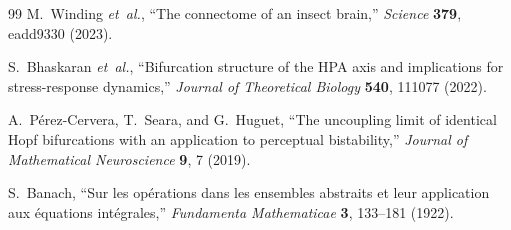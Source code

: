 \documentclass[12pt,a4paper]{article}
\begin{document}
\begin{thebibliography}{99}
M.~Winding \textit{et~al.},
``The connectome of an insect brain,''
\textit{Science} \textbf{379}, eadd9330 (2023).

S.~Bhaskaran \textit{et~al.},
``Bifurcation structure of the HPA axis and implications for
stress-response dynamics,''
\textit{Journal of Theoretical Biology} \textbf{540}, 111077 (2022).

A.~P\'{e}rez-Cervera, T.~Seara, and G.~Huguet,
``The uncoupling limit of identical Hopf bifurcations with an
application to perceptual bistability,''
\textit{Journal of Mathematical Neuroscience} \textbf{9}, 7 (2019).

S.~Banach,
``Sur les op\'{e}rations dans les ensembles abstraits et leur
application aux \'{e}quations int\'{e}grales,''
\textit{Fundamenta Mathematicae} \textbf{3}, 133--181 (1922).

\end{thebibliography}
\end{document}
